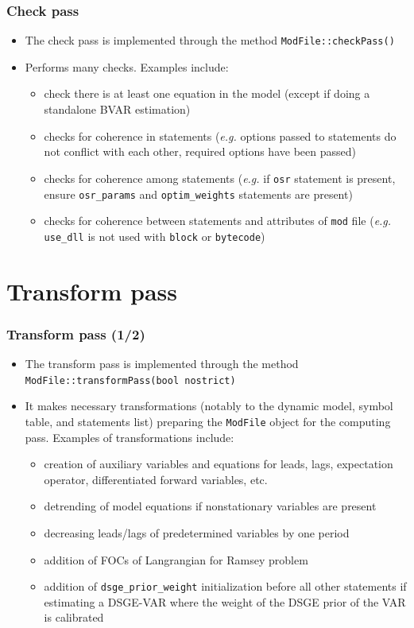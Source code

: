\documentclass{beamer}
\begin{document}
\begin{frame}
  \frametitle{Check pass}
  \begin{itemize}
  \item The check pass is implemented through the method \texttt{ModFile::checkPass()}
  \item Performs many checks. Examples include:
    \begin{itemize}
    \item check there is at least one equation in the model (except if doing a standalone BVAR estimation)
    \item checks for coherence in statements (\textit{e.g.} options passed to statements do not conflict with each other, required options have been passed)
    \item checks for coherence among statements (\textit{e.g.} if \texttt{osr} statement is present, ensure \texttt{osr\_params} and \texttt{optim\_weights} statements are present)
    \item checks for coherence between statements and attributes of \texttt{mod} file (\textit{e.g.} \texttt{use\_dll} is not used with \texttt{block} or \texttt{bytecode})
    \end{itemize}
  \end{itemize}
\end{frame}

\section{Transform pass}

\begin{frame}
  \frametitle{Transform pass (1/2)}
  \begin{itemize}
  \item The transform pass is implemented through the method \texttt{ModFile::transformPass(bool nostrict)}
  \item It makes necessary transformations (notably to the dynamic model, symbol table, and statements list) preparing the \texttt{ModFile} object for the computing pass. Examples of transformations include:
    \begin{itemize}
    \item creation of auxiliary variables and equations for leads, lags, expectation operator, differentiated forward variables, etc.
    \item detrending of model equations if nonstationary variables are present
    \item decreasing leads/lags of predetermined variables by one period
    \item addition of FOCs of Langrangian for Ramsey problem
    \item addition of \texttt{dsge\_prior\_weight} initialization before all other statements if estimating a DSGE-VAR where the weight of the DSGE prior of the VAR is calibrated
    \end{itemize}
  \end{itemize}
\end{frame}
\end{document}
